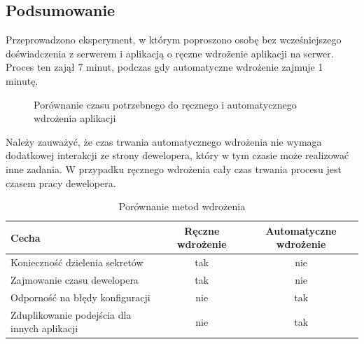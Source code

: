 \documentclass{article}
\begin{document}
\subsection{Podsumowanie}

Przeprowadzono eksperyment, w którym poproszono osobę bez wcześniejszego doświadczenia z serwerem i aplikacją o ręczne wdrożenie aplikacji na serwer. Proces ten zajął 7 minut, podczas gdy automatyczne wdrożenie zajmuje 1 minutę.

\begin{figure}[H]
\centering
{}
\caption{Porównanie czasu potrzebnego do ręcznego i automatycznego wdrożenia aplikacji}
\label{fig:czas_wdrozenia}
\end{figure}

Należy zauważyć, że czas trwania automatycznego wdrożenia nie wymaga dodatkowej interakcji ze strony dewelopera, który w tym czasie może realizować inne zadania. W przypadku ręcznego wdrożenia cały czas trwania procesu jest czasem pracy dewelopera.

\begin{table}[H]
\centering
\begin{tabular}{|l|c|c|}
\hline
\textbf{Cecha} & \textbf{Ręczne wdrożenie} & \textbf{Automatyczne wdrożenie} \\ \hline
Konieczność dzielenia sekretów & \cellcolor{red!50}tak & \cellcolor{green!50}nie \\ \hline
Zajmowanie czasu dewelopera & \cellcolor{red!50}tak & \cellcolor{green!50}nie \\ \hline
Odporność na błędy konfiguracji & \cellcolor{red!50}nie & \cellcolor{green!50}tak \\ \hline
Zduplikowanie podejścia dla innych aplikacji & \cellcolor{red!50}nie & \cellcolor{green!50}tak \\ \hline
\end{tabular}
\caption{Porównanie metod wdrożenia}
\label{tab:porownanie-metod-wdrazania}
\end{table}
\end{document}

